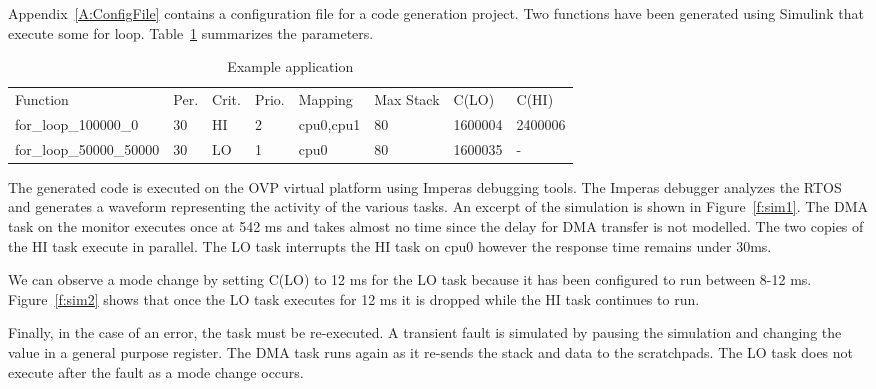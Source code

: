 	Appendix~\ref{A:ConfigFile} contains a configuration file for a code generation project. 
	Two functions have been generated using Simulink that execute some for loop. Table~\ref{t:config} summarizes the parameters.
	
	
	

\begin{table}[h]
\caption{Example application}
\centering

	\begin{tabular}{@{}llllllll@{}}
	\toprule
	Function & Per. & Crit. & Prio. & Mapping & Max Stack & C(LO) & C(HI) 	 \\
	for\_loop\_100000\_0 & 30 & HI & 2 & cpu0,cpu1 & 80 & 1600004 & 2400006 \\
	for\_loop\_50000\_50000 & 30 & LO & 1 & cpu0 & 80 & 1600035 & - \\
	\end{tabular}

\label{t:config}
\end{table}
	

	The generated code is executed on the OVP virtual platform using Imperas debugging tools. The Imperas debugger analyzes the RTOS and generates a waveform representing the activity of the various tasks. 
	An excerpt of the simulation is shown in Figure~\ref{f:sim1}.
	The DMA task on the monitor executes once at 542 ms and takes almost no time since the delay for DMA transfer is not modelled.
	The two copies of the HI task execute in parallel. The LO task interrupts the HI task on cpu0 however the response time remains under 30ms.
	
	We can observe a mode change by setting C(LO) to 12 ms for the LO task because it has been configured to run between 8-12 ms. 
	Figure~\ref{f:sim2} shows that once the LO task executes for 12 ms it is dropped while the HI task continues to run.
	 
		
	Finally, in the case of an error, the task must be re-executed. 
	A transient fault is simulated by pausing the simulation and changing the value in a general purpose register. 
	The DMA task runs again as it re-sends the stack and data to the scratchpads.
	The LO task does not execute after the fault as a mode change occurs.
	
		 
		
